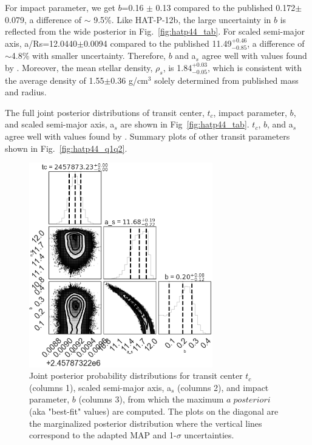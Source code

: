 For impact parameter, we get $b$=0.16 $\pm$ 0.13 compared to the published 0.172$\pm$0.079, a difference of $\sim$ 9.5\%. Like HAT-P-12b, the large uncertainty in $b$ is reflected from the wide posterior in Fig.~\ref{fig:hatp44_tab}. For scaled semi-major axis, a/Rs=12.0440$\pm$0.0094 compared to the published 11.49$^{+0.46}_{-0.85}$, a difference of $\sim$4.8\% with smaller uncertainty. Therefore, $b$ and a$_s$ agree well with values found by \cite{Hartmann2014}. Moreover, the mean stellar density, $\rho_s$, is 1.84$_{-0.05}^{+0.03}$, which is consistent with the average density of 1.55$\pm$0.36 g/cm$^3$ solely determined from published mass and radius.

The full joint posterior distributions of transit center, $t_c$, impact parameter, $b$, and scaled semi-major axis, a$_s$ are shown in Fig~\ref{fig:hatp44_tab}. $t_c$, $b$, and a$_s$ agree well with values found by \cite{Hartmann2014}. Summary plots of other transit parameters shown in Fig.~\ref{fig:hatp44_q1q2}.

\begin{figure}
\centering
	\includegraphics[width=8cm]{hatp12/joint_tc_a_b.png}
    \caption{Joint posterior probability distributions for transit center $t_c$ (columns 1), scaled semi-major axis, a$_s$ (columns 2), and impact parameter, $b$ (columns 3), from which the maximum $a \; posteriori$ (aka "best-fit" values) are computed. The plots on the diagonal are the marginalized posterior distribution where the vertical lines correspond to the adapted MAP and 1-$\sigma$ uncertainties.
    }
\label{fig:hatp12_tab}
\end{figure}

